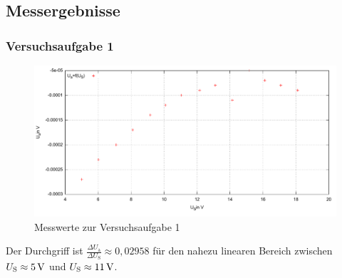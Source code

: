 \documentclass[numbers=noenddot,12pt,a4paper]{scrartcl}
\newcommand{\ix}[1]{_\text{#1}}
\begin{document}
\subsection{Messergebnisse}
\subsubsection{Versuchsaufgabe 1}
\begin{figure}[H]
\centering
\includegraphics[width=\textwidth]{aufg1.pdf}
\caption{Messwerte zur Versuchsaufgabe 1}\label{img:aufg1}
\end{figure}
Der Durchgriff ist $\frac{\Delta U\ix{a}}{\Delta U\ix{S}}\approx0,02958$ für den nahezu linearen Bereich zwischen $U\ix{S}\approx\unit[5]{V}$ und $U\ix{S}\approx\unit[11]{V}$.
\end{document}
